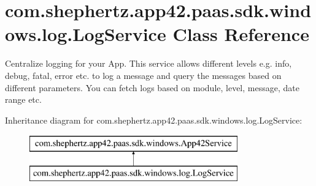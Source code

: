 \hypertarget{classcom_1_1shephertz_1_1app42_1_1paas_1_1sdk_1_1windows_1_1log_1_1_log_service}{\section{com.\+shephertz.\+app42.\+paas.\+sdk.\+windows.\+log.\+Log\+Service Class Reference}
\label{classcom_1_1shephertz_1_1app42_1_1paas_1_1sdk_1_1windows_1_1log_1_1_log_service}
}


Centralize logging for your App. This service allows different levels e.\+g. info, debug, fatal, error etc. to log a message and query the messages based on different parameters. You can fetch logs based on module, level, message, date range etc.  


Inheritance diagram for com.\+shephertz.\+app42.\+paas.\+sdk.\+windows.\+log.\+Log\+Service\+:\begin{figure}[H]
\begin{center}
\leavevmode
\includegraphics[height=2.000000cm]{classcom_1_1shephertz_1_1app42_1_1paas_1_1sdk_1_1windows_1_1log_1_1_log_service}
\end{center}
\end{figure}
